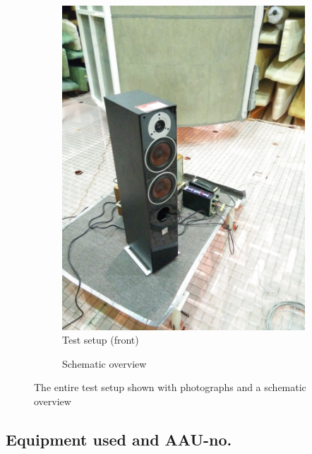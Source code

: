 \begin{figure}[H]
\begin{subfigure}[t]{0.47\textwidth}
	\includegraphics[width=1\textwidth]{figures/Test_setup_front.jpg}
	\caption{Test setup (front)}
	\label{fig:test_setup_front_R}
\end{subfigure}
\begin{subfigure}[b]{\textwidth}
	\centering
	
	\caption{Schematic overview}
	\label{figure:SpeakertestSetup}
\end{subfigure}
\caption{The entire test setup shown with photographs and a schematic overview}
\label{fig:test_setup_R}
\end{figure}


\subsection*{Equipment used and AAU-no.}

